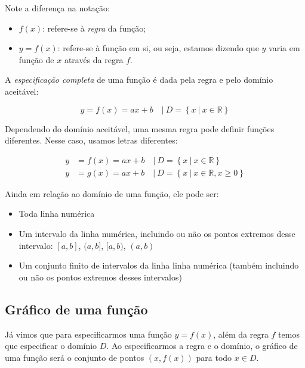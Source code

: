 \documentclass[pdftex, brazil, 12pt, twoside]{article}
\begin{document}
Note a diferença na notação:

\begin{itemize}[noitemsep]
\item $f(x)$: refere-se à \emph{regra} da função;
\item $y = f(x)$: refere-se à função em si, ou seja, estamos dizendo que $y$ varia
  em função de $x$ através da regra $f$.
\end{itemize}

A \emph{especificação completa} de uma função é dada pela regra e pelo domínio
aceitável:

\begin{equation}
    y = f(x) = ax + b \quad |\ D = \left\{x\ |\ x \in \mathbb{R}\right\}
\end{equation}

Dependendo do domínio aceitável, uma mesma regra pode definir funções diferentes.
Nesse caso, usamos letras diferentes:

\begin{equation}
  \begin{split}
    y & = f(x) = ax + b \quad |\ D = \left\{x\ |\ x \in \mathbb{R}\right\}\\
    y & = g(x) = ax + b \quad |\ D = \left\{x\ |\ x \in \mathbb{R}, x \ge 0\right\}
  \end{split}
\end{equation}

Ainda em relação ao domínio de uma função, ele pode ser:

\begin{itemize}[noitemsep]
\item Toda linha numérica
\item Um intervalo da linha numérica, incluindo ou não os pontos extremos desse intervalo:
  $[a,b]$, $(a,b]$, $[a,b)$, $(a,b)$
\item Um conjunto finito de intervalos da linha linha numérica (também incluindo ou não os pontos extremos desses intervalos)
\end{itemize}


\subsection{Gráfico de uma função}
\label{funcoes-grafico}

Já vimos que para especificarmos uma função $y = f(x)$, além da regra $f$ temos que
especificar o domínio $D$. Ao especificarmos a regra e o domínio, o gráfico de
uma função será o conjunto de pontos $(x, f(x))$ para todo $x \in D$.
\end{document}
